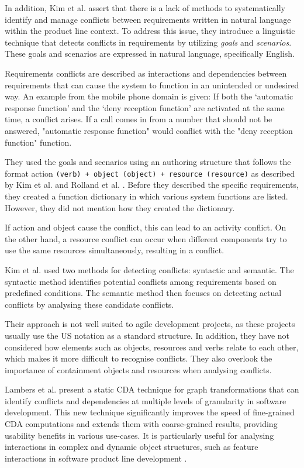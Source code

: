 In addition, Kim et al. assert that there is a lack of methods to systematically identify and manage conflicts between requirements written in natural language within the product line context. To address this issue, they introduce a linguistic technique that detects conflicts in requirements by utilizing \textit{goals} and \textit{scenarios}. These goals and scenarios are expressed in natural language, specifically English.

Requirements conflicts are described as interactions and dependencies between requirements that can cause the system to function in an unintended or undesired way. An example from the mobile phone domain is given: If both the ‘automatic response function’ and the ‘deny reception function’ are activated at the same time, a conflict arises. If a call comes in from a number that should not be answered, "automatic response function" would conflict with the "deny reception function" function.

They used the goals and scenarios using an authoring structure that follows the format action \texttt{(verb) + object (object) + resource (resource)} as described by Kim et al. \cite{kim2004method,kim2004multi} and Rolland et al. \cite{rolland1998guiding}. Before they described the specific requirements, they created a function dictionary in which various system functions are listed. However, they did not mention how they created the dictionary.

If action and object cause the conflict, this can lead to an activity conflict. On the other hand, a resource conflict can occur when different components try to use the same resources simultaneously, resulting in a conflict.

Kim et al. used two methods for detecting conflicts: syntactic and semantic. The syntactic method identifies potential conflicts among requirements based on predefined conditions. The semantic method then focuses on detecting actual conflicts by analysing these candidate conflicts.

Their approach is not well suited to agile development projects, as these projects usually use the US notation as a standard structure. In addition, they have not considered how elements such as objects, resources and verbs relate to each other, which makes it more difficult to recognise conflicts. They also overlook the importance of containment objects and resources when analysing conflicts.

Lambers et al. present a static CDA technique for graph transformations that can identify conflicts and dependencies at multiple levels of granularity in software development. This new technique significantly improves the speed of fine-grained CDA computations and extends them with coarse-grained results, providing usability benefits in various use-cases. It is particularly useful for analysing interactions in complex and dynamic object structures, such as feature interactions in software product line development \cite{lambers2018multi}.

